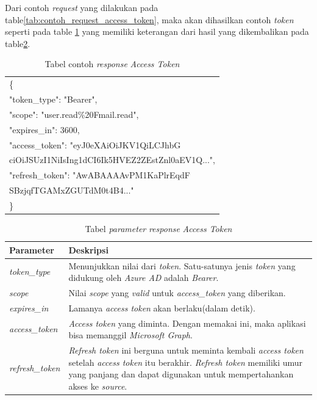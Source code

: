 Dari contoh \textit{request} yang dilakukan pada table\ref{tab:contoh_request_access_token}, maka akan dihasilkan contoh \textit{token} seperti pada table \ref{tab:contoh_response_access_token} yang memiliki keterangan dari hasil yang dikembalikan pada table\ref{tab:parameter_response_access_token}. 

\begin{table}[H]
	\centering 
	\caption{Tabel contoh \textit{response} \textit{Access Token}}
	\label{tab:contoh_response_access_token}
	\begin{tabular}{|p{9cm}|}
	\toprule
	\{\\
    "token\_type": "Bearer",\\
    "scope": "user.read\%20Fmail.read",\\
    "expires\_in": 3600,\\
    "access\_token": "eyJ0eXAiOiJKV1QiLCJhbG\\
    ciOiJSUzI1NiIsIng1dCI6Ik5HVEZ2ZEstZnl0aEV1Q...",\\
    "refresh\_token": "AwABAAAAvPM1KaPlrEqdF\\
    SBzjqfTGAMxZGUTdM0t4B4..."\\
	\}\\ 
	\bottomrule
	\end{tabular}  
\end{table}

\begin{table}[H]
	\centering 
	\caption{Tabel \textit{parameter} \textit{response} \textit{Access Token}}
	\label{tab:parameter_response_access_token}
	\begin{tabular}{|p{3cm}|p{9cm}|}
	\toprule
	 \textbf{Parameter} & \textbf{Deskripsi}\\ \hline 
	\textit{token\_type} & Menunjukkan nilai dari \textit{token}. Satu-satunya jenis \textit{token} yang didukung oleh \textit{Azure AD} adalah \textit{Bearer}.\\ \hline 
	\textit{scope} & Nilai \textit{scope} yang \textit{valid} untuk \textit{access\_token} yang diberikan.  \\ \hline 
	\textit{expires\_in} & Lamanya \textit{access token} akan berlaku(dalam detik). \\ \hline  
	\textit{access\_token} & \textit{Access token} yang diminta. Dengan memakai ini, maka aplikasi bisa memanggil \textit{Microsoft Graph}. \\ \hline 
	\textit{refresh\_token} & \textit{Refresh token} ini berguna untuk meminta kembali \textit{access token} setelah \textit{access token} itu berakhir. \textit{Refresh token} memiliki umur yang panjang dan dapat digunakan untuk mempertahankan akses ke \textit{source}. \\
	\bottomrule
	\end{tabular}  
\end{table}

